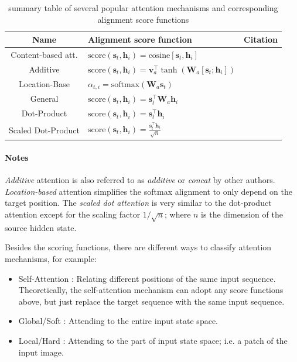 \begin{table}[hpt]
\caption{summary table of several popular attention mechanisms and corresponding alignment score functions}
\label{tab:attention-mechanisms}
\begin{tabular}{cll}
Name & Alignment score function & Citation \\
\hline
Content-based att. & $\text{score}(\boldsymbol{s}_t, \boldsymbol{h}_i) = \text{cosine}[\boldsymbol{s}_t, \boldsymbol{h}_i]$ & \citep{Graves2014} \\
Additive & $\text{score}(\boldsymbol{s}_t, \boldsymbol{h}_i) = \mathbf{v}_a^\top \tanh(\mathbf{W}_a[\boldsymbol{s}_t; \boldsymbol{h}_i])$ & \citep{Bahdanau2015} \\
Location-Base & $\alpha_{t,i} = \text{softmax}(\mathbf{W}_a \boldsymbol{s}_t)$ & \citep{Luong2015} \\
General & $\text{score}(\boldsymbol{s}_t, \boldsymbol{h}_i) = \boldsymbol{s}_t^\top\mathbf{W}_a\boldsymbol{h}_i$ & \citep{Luong2015} \\
Dot-Product & $\text{score}(\boldsymbol{s}_t, \boldsymbol{h}_i) = \boldsymbol{s}_t^\top\boldsymbol{h}_i$ & \citep{Luong2015} \\
Scaled Dot-Product & $\text{score}(\boldsymbol{s}_t, \boldsymbol{h}_i) = \frac{\boldsymbol{s}_t^\top\boldsymbol{h}_i}{\sqrt{n}}$  & \citep{Vaswani2017}
\end{tabular}
\end{table}

\paragraph{Notes} \textit{Additive} attention is also referred to as \textit{additive} or \textit{concat} by other authors. \textit{Location-based} attention simplifies the softmax alignment to only depend on the target position. The \textit{scaled dot attention} is very similar to the dot-product attention except for the scaling factor $1/\sqrt{n}$; where $n$ is the dimension of the source hidden state.

Besides the scoring functions, there are different ways to classify attention mechanisms, for example:

\begin{itemize}
    \item Self-Attention \citep{Cheng2016}: Relating different positions of the same input sequence. Theoretically, the self-attention mechanism can adopt any score functions above, but just replace the target sequence with the same input sequence. 
    \item Global/Soft \cite{Xu2015}: Attending to the entire input state space. 
    \item Local/Hard \citep{Xu2015, Luong2015}: Attending to the part of input state space; i.e. a patch of the input image.
\end{itemize}

